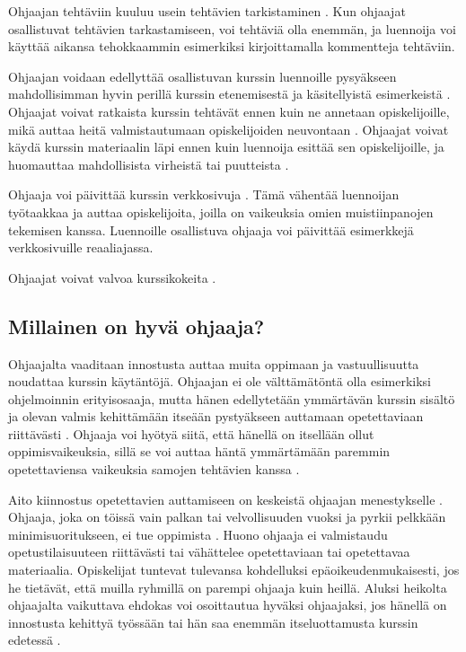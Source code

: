 \documentclass[finnish]{tktltiki2}
\theoremstyle{definition}
\theoremstyle{remark}
\begin{document}
Ohjaajan tehtäviin kuuluu usein tehtävien tarkistaminen \cite{Dickson11}. Kun ohjaajat osallistuvat tehtävien tarkastamiseen, voi tehtäviä olla enemmän, ja luennoija voi käyttää aikansa tehokkaammin esimerkiksi kirjoittamalla kommentteja tehtäviin. \par

Ohjaajan voidaan edellyttää osallistuvan kurssin luennoille pysyäkseen mahdollisimman hyvin perillä kurssin etenemisestä ja käsitellyistä esimerkeistä \cite{Reges03, Decker06}. Ohjaajat voivat ratkaista kurssin tehtävät ennen kuin ne annetaan opiskelijoille, mikä auttaa heitä valmistautumaan opiskelijoiden neuvontaan \cite{Vihavainen}. Ohjaajat voivat käydä kurssin materiaalin läpi ennen kuin luennoija esittää sen opiskelijoille, ja huomauttaa mahdollisista virheistä tai puutteista \cite{Vikberg}. \par

Ohjaaja voi päivittää kurssin verkkosivuja \cite{Dickson11}. Tämä vähentää luennoijan työtaakkaa ja auttaa opiskelijoita, joilla on vaikeuksia omien muistiinpanojen tekemisen kanssa. Luennoille osallistuva ohjaaja voi päivittää esimerkkejä verkkosivuille reaaliajassa. \par

Ohjaajat voivat valvoa kurssikokeita \cite{Richards00}. \par


 








\subsection{Millainen on hyvä ohjaaja?}
Ohjaajalta vaaditaan innostusta auttaa muita oppimaan ja vastuullisuutta noudattaa kurssin käytäntöjä. Ohjaajan ei ole välttämätöntä olla esimerkiksi ohjelmoinnin erityisosaaja, mutta hänen edellytetään ymmärtävän kurssin sisältö ja olevan valmis kehittämään itseään pystyäkseen auttamaan opetettaviaan riittävästi \cite{Reges88}. Ohjaaja voi hyötyä siitä, että hänellä on itsellään ollut oppimisvaikeuksia, sillä se voi auttaa häntä ymmärtämään paremmin opetettaviensa vaikeuksia samojen tehtävien kanssa \cite{Decker06}. \par

Aito kiinnostus opetettavien auttamiseen on keskeistä ohjaajan menestykselle \cite{Richards00}. Ohjaaja, joka on töissä vain palkan tai velvollisuuden vuoksi ja pyrkii pelkkään minimisuoritukseen, ei tue oppimista \cite{Richards00}. Huono ohjaaja ei valmistaudu opetustilaisuuteen riittävästi tai vähättelee opetettaviaan tai opetettavaa materiaalia. Opiskelijat tuntevat tulevansa kohdelluksi epäoikeudenmukaisesti, jos he tietävät, että muilla ryhmillä on parempi ohjaaja kuin heillä. Aluksi heikolta ohjaajalta vaikuttava ehdokas voi osoittautua hyväksi ohjaajaksi, jos hänellä on innostusta kehittyä työssään tai hän saa enemmän itseluottamusta kurssin edetessä \cite{Dickson11}. \par
\end{document}
